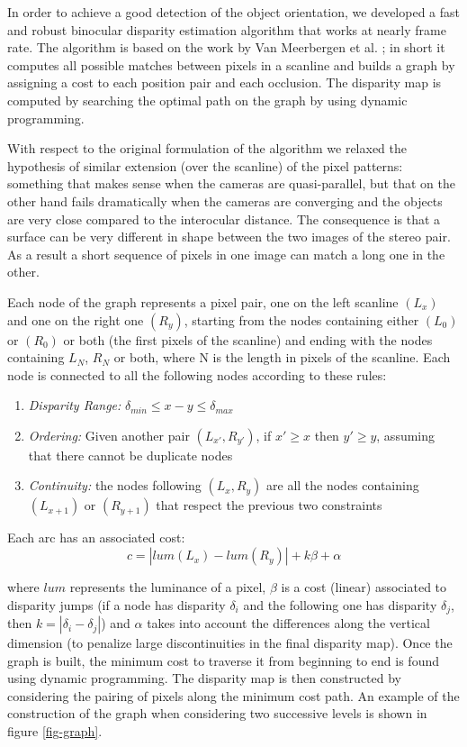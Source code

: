 In order to achieve a good detection of the object orientation, we developed a fast and robust binocular disparity estimation algorithm that works at nearly frame rate. The algorithm is based on the work by Van Meerbergen et al. \cite{merrbergen02stereo}; in short it computes all possible matches between pixels in a scanline and builds a graph by assigning a cost to each position pair and each occlusion. The disparity map is computed by searching the optimal path on the graph by using dynamic programming.

With respect to the original formulation of the algorithm we relaxed the hypothesis of similar extension (over the scanline) of the pixel patterns: something that makes sense when the cameras are quasi-parallel, but that on the other hand fails dramatically when the cameras are converging and the objects are very close compared to the interocular distance.
The consequence is that a surface can be very different in shape between the two images of the stereo pair. As a result a short sequence of pixels in one image can match a long one in the other.

Each node of the graph represents a pixel pair, one on the left scanline $(L_x)$ and one on the right one $(R_y)$, starting from the nodes containing either $(L_0)$ or $(R_0)$ or both (the first pixels of the scanline) and ending with the nodes containing ${L_N}$, ${R_N}$ or both, where N is the length in pixels of the scanline. Each node is connected to all the following nodes according to these rules:

\begin{enumerate}
	\item \textit{Disparity Range:} $\delta_{min}\leq x-y \leq \delta_{max}$
	\item \textit{Ordering:} Given another pair $(L_{x'},R_{y'})$, if $x'\geq x$ then $y'\geq y$, assuming that there cannot be duplicate nodes
	\item \textit{Continuity:} the nodes following $(L_x,R_y)$ are all the nodes containing $(L_{x+1})$ or $(R_{y+1})$ that respect the previous two constraints
\end{enumerate}

\noindent Each arc has an associated cost:
	\[c=\left|lum(L_x)-lum(R_y)\right|+k\beta+\alpha
\]

\noindent where $lum$ represents the luminance of a pixel, $\beta$ is a cost (linear) associated to disparity jumps (if a node has disparity $\delta_i$ and the following one has disparity $\delta_j$, then $k=|\delta_i-\delta_j|$) and $\alpha$ takes into account the differences along the vertical dimension (to penalize large discontinuities in the final disparity map). Once the graph is built, the minimum cost to traverse it from beginning to end is found using dynamic programming. The disparity map is then constructed by considering the pairing of pixels along the minimum cost path. An example of the construction of the graph when considering two successive levels is shown in figure \ref{fig-graph}.

